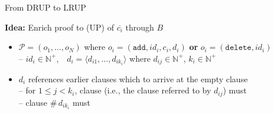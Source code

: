 \documentclass[t,english]{sdqbeamer}
\begin{document}
\begin{frame}{From DRUP to LRUP~\cite{cruz2017efficient}}
	
	\vspace*{-2mm}
	\textbf{Idea:} Enrich proof to  (UP) of $\overline{c_i}$ through $B$
	\begin{itemize}
		\item $\mathcal{P} = (o_1, \ldots, o_N)$ where $o_i = (\texttt{add}, id_i, c_i, d_i)$ \textbf{or} $o_i = (\texttt{delete}, id_i)$\\
		-- $id_i \in \mathbb{N}^+$,\ \ $d_i = \langle d_{i1}, \ldots, d_{ik_i} \rangle$ where $d_{ij} \in \mathbb{N}^+$, $k_i \in \mathbb{N}^+$\\
		\item $d_i$ references earlier clauses which  to arrive at the empty clause\\
		-- for $1 \leq j < k_i$, clause  (i.e., the clause referred to by $d_{ij}$) must \\
		-- clause \#\,$d_{ik_i}$ must 
	\end{itemize}
	

\end{frame}
\end{document}
